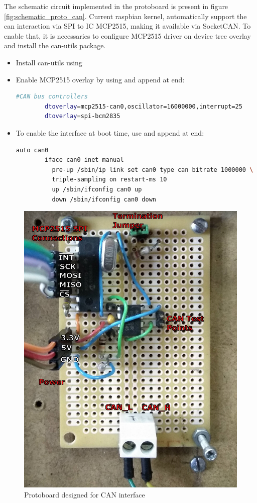 The schematic circuit implemented in the protoboard is present in figure \ref{fig:schematic_proto_can}.
Current raspbian kernel, automatically support the can interaction via \gls{SPI} to \gls{IC} MCP2515, making it available via SocketCAN. To enable that, it is necessaries to configure MCP2515 driver on device tree overlay and install the can-utils package.
\begin{itemize}
	\tightlist
	\item Install can-utils using 
	\item Enable MCP2515 overlay by using  and append at end:
	\begin{lstlisting}[frame=none,language=bash,backgroundcolor=\color{gray!15},numbers=none,basicstyle=\ttfamily]
		#CAN bus controllers
		dtoverlay=mcp2515-can0,oscillator=16000000,interrupt=25
		dtoverlay=spi-bcm2835
	\end{lstlisting}
	\item To enable the interface at boot time, use  and append at end:
	\begin{minipage}{\linewidth} %
		\begin{lstlisting}[frame=none,language=bash,backgroundcolor=\color{gray!15},numbers=none,		basicstyle=\ttfamily]
		auto can0
		iface can0 inet manual
		  pre-up /sbin/ip link set can0 type can bitrate 1000000 \ 
		  triple-sampling on restart-ms 10
		  up /sbin/ifconfig can0 up
		  down /sbin/ifconfig can0 down
		\end{lstlisting}
	\end{minipage}
\end{itemize}

\begin{figure}[hb]
	\centering
	\includegraphics[width=0.5\linewidth]{figures/proto_can}
	\caption{Protoboard designed for CAN interface}
	\label{fig:proto_can}
\end{figure}

